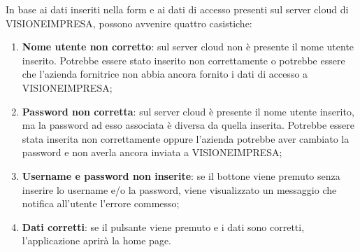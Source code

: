 In base ai dati inseriti nella form e ai dati di accesso presenti sul server cloud di VISIONEIMPRESA, possono avvenire quattro casistiche:
\begin{enumerate}
	\item \textbf{Nome utente non corretto}: sul server cloud non è presente il nome utente inserito. Potrebbe essere stato inserito non correttamente
	o potrebbe essere che l'azienda fornitrice non abbia ancora fornito i dati di accesso a VISIONEIMPRESA;
	\item \textbf{Password non corretta}: sul server cloud è presente il nome utente inserito, ma la password ad esso associata è diversa da quella
	inserita. Potrebbe essere stata inserita non correttamente oppure l'azienda potrebbe aver cambiato la password e non averla ancora inviata
	a VISIONEIMPRESA;
	\item \textbf{Username e password non inserite}: se il bottone viene premuto senza inserire lo username e/o la password, viene visualizzato un
	messaggio che notifica all'utente l'errore commesso;
	\item \textbf{Dati corretti}: se il pulsante viene premuto e i dati sono corretti, l'applicazione aprirà la home page.
\end{enumerate}

